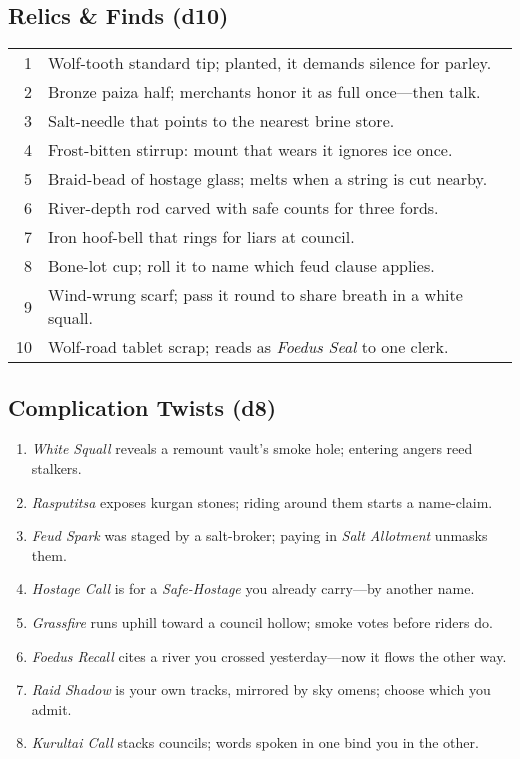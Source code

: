 \subsection*{Relics \& Finds (d10)}
\begin{tabular}{r l}
1 & Wolf-tooth standard tip; planted, it demands silence for parley. \\
2 & Bronze paiza half; merchants honor it as full once—then talk. \\
3 & Salt-needle that points to the nearest brine store. \\
4 & Frost-bitten stirrup: mount that wears it ignores ice once. \\
5 & Braid-bead of hostage glass; melts when a string is cut nearby. \\
6 & River-depth rod carved with safe counts for three fords. \\
7 & Iron hoof-bell that rings for liars at council. \\
8 & Bone-lot cup; roll it to name which feud clause applies. \\
9 & Wind-wrung scarf; pass it round to share breath in a white squall. \\
10 & Wolf-road tablet scrap; reads as \emph{Foedus Seal} to one clerk. \\
\end{tabular}

\subsection*{Complication Twists (d8)}
\begin{enumerate}
  \item \emph{White Squall} reveals a remount vault’s smoke hole; entering angers reed stalkers.
  \item \emph{Rasputitsa} exposes kurgan stones; riding around them starts a name-claim.
  \item \emph{Feud Spark} was staged by a salt-broker; paying in \emph{Salt Allotment} unmasks them.
  \item \emph{Hostage Call} is for a \emph{Safe-Hostage} you already carry—by another name.
  \item \emph{Grassfire} runs uphill toward a council hollow; smoke votes before riders do.
  \item \emph{Foedus Recall} cites a river you crossed yesterday—now it flows the other way.
  \item \emph{Raid Shadow} is your own tracks, mirrored by sky omens; choose which you admit.
  \item \emph{Kurultai Call} stacks councils; words spoken in one bind you in the other.
\end{enumerate}

